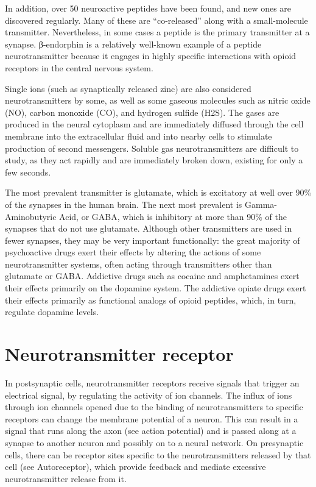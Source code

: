 In addition, over 50 neuroactive peptides have been found, and new ones are discovered regularly. Many of these are ``co-released'' along with a small-molecule transmitter. Nevertheless, in some cases a peptide is the primary transmitter at a synapse. β-endorphin is a relatively well-known example of a peptide neurotransmitter because it engages in highly specific interactions with opioid receptors in the central nervous system.

Single ions (such as synaptically released zinc) are also considered neurotransmitters by some, as well as some gaseous molecules such as nitric oxide (NO), carbon monoxide (CO), and hydrogen sulfide (H2S). The gases are produced in the neural cytoplasm and are immediately diffused through the cell membrane into the extracellular fluid and into nearby cells to stimulate production of second messengers. Soluble gas neurotransmitters are difficult to study, as they act rapidly and are immediately broken down, existing for only a few seconds.

The most prevalent transmitter is glutamate, which is excitatory at well over 90\% of the synapses in the human brain. The next most prevalent is Gamma-Aminobutyric Acid, or GABA, which is inhibitory at more than 90\% of the synapses that do not use glutamate. Although other transmitters are used in fewer synapses, they may be very important functionally: the great majority of psychoactive drugs exert their effects by altering the actions of some neurotransmitter systems, often acting through transmitters other than glutamate or GABA. Addictive drugs such as cocaine and amphetamines exert their effects primarily on the dopamine system. The addictive opiate drugs exert their effects primarily as functional analogs of opioid peptides, which, in turn, regulate dopamine levels.

\hypertarget{neurotransmitter-receptor}{%
\section{Neurotransmitter receptor}\label{neurotransmitter-receptor}}

In postsynaptic cells, neurotransmitter receptors receive signals that trigger an electrical signal, by regulating the activity of ion channels. The influx of ions through ion channels opened due to the binding of neurotransmitters to specific receptors can change the membrane potential of a neuron. This can result in a signal that runs along the axon (see action potential) and is passed along at a synapse to another neuron and possibly on to a neural network. On presynaptic cells, there can be receptor sites specific to the neurotransmitters released by that cell (see Autoreceptor), which provide feedback and mediate excessive neurotransmitter release from it.

